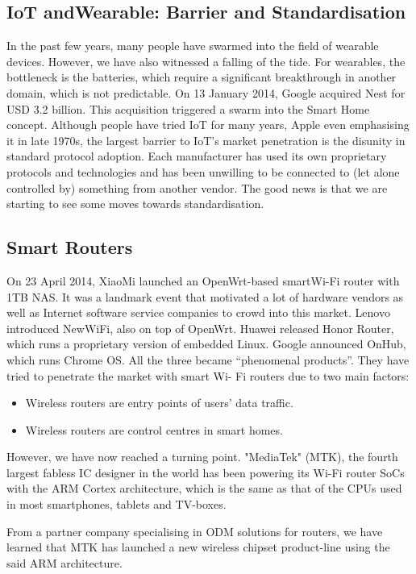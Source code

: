 \subsection{IoT andWearable: Barrier and Standardisation}
In the past few years, many people have swarmed into the field of wearable devices.
However, we have also witnessed a falling of the tide. For wearables, the bottleneck is
the batteries, which require a significant breakthrough in another domain, which is not
predictable.
On 13 January 2014, Google acquired Nest for USD 3.2 billion. This acquisition triggered
a swarm into the Smart Home concept. Although people have tried IoT for many
years, Apple even emphasising it in late 1970s, the largest barrier to IoT’s market penetration
is the disunity in standard protocol adoption. Each manufacturer has used its
own proprietary protocols and technologies and has been unwilling to be connected to
(let alone controlled by) something from another vendor. The good news \citep{Bille2016RTCSS} is that we are
starting to see some moves towards standardisation.
\subsection{Smart Routers}
On 23 April 2014, XiaoMi launched an OpenWrt-based smartWi-Fi router with 1TB NAS.
It was a landmark event that motivated a lot of hardware vendors as well as Internet
software service companies to crowd into this market. Lenovo introduced NewWiFi, also
on top of OpenWrt. Huawei released Honor Router, which runs a proprietary version
of embedded Linux. Google announced OnHub, which runs Chrome OS. All the three
became “phenomenal products”. They have tried to penetrate the market with smart Wi-
Fi routers due to two main factors:
 \begin{itemize}
 	\item Wireless routers are entry points of users’ data traffic.
  \item Wireless routers are control centres in smart homes.
 \end{itemize}
However, we have now reached a turning point. "MediaTek" (MTK), the fourth largest
fabless IC designer in the world has been powering its Wi-Fi router SoCs with the ARM
Cortex architecture, which is the same as that of the CPUs used in most smartphones,
tablets and TV-boxes.

From a partner company specialising in ODM solutions for routers, we have learned
that MTK has launched a new wireless chipset product-line using the said ARM architecture.


